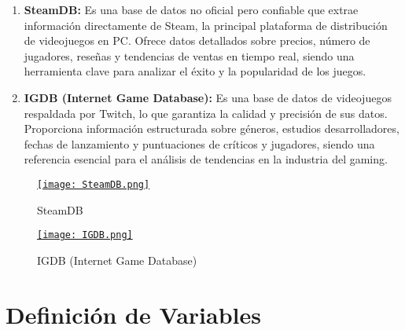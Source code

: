 \documentclass[titlepage,a4paper]{article}
\begin{document}
\begin{enumerate}
    \item \textbf{SteamDB: }Es una base de datos no oficial pero confiable que extrae información directamente de Steam, la principal plataforma de distribución de videojuegos en PC. Ofrece datos detallados sobre precios, número de jugadores, reseñas y tendencias de ventas en tiempo real, siendo una herramienta clave para analizar el éxito y la popularidad de los juegos. \\

    \item \textbf{IGDB (Internet Game Database): }Es una base de datos de videojuegos respaldada por Twitch, lo que garantiza la calidad y precisión de sus datos. Proporciona información estructurada sobre géneros, estudios desarrolladores, fechas de lanzamiento y puntuaciones de críticos y jugadores, siendo una referencia esencial para el análisis de tendencias en la industria del gaming.
\end{enumerate}

\begin{figure}[h]

\hspace{0.01\textwidth}
    \centering
    \begin{minipage}{0.45\textwidth} %
        \centering
        \href{https://steamdb.info}{ %
            \texttt{[image: SteamDB.png]}
        }
        \caption{SteamDB}
    \end{minipage}
    \hspace{0.07\textwidth} %
    \begin{minipage}{0.45\textwidth}
        \centering
        \href{https://www.igdb.com/top-100/games/platform/all/2000-2025}{\texttt{[image: IGDB.png]}
        }
        \caption{IGDB (Internet Game Database)}
    \end{minipage}
\end{figure}

\vspace{1cm}


\section{Definición de Variables}
\end{document}
